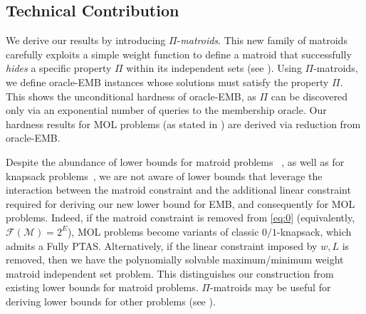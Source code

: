 \documentclass[11pt,letter]{article}
\newcommand{\cm}{{\mathcal{M}}}
\newcommand{\cF}{{\mathcal{F}}}
\begin{document}
 

\subsection{Technical Contribution}
We derive our results by introducing $\Pi$-{\em matroids}.
This new family of matroids carefully exploits a simple weight function to define a matroid that successfully {\em hides} a specific property $\Pi$ within its independent sets (see ). Using $\Pi$-matroids, we define %
	oracle-EMB instances whose solutions must satisfy the property $\Pi$. This shows the unconditional hardness of oracle-EMB, as $\Pi$ can be discovered only via an exponential number of queries to the membership oracle. Our hardness results for MOL problems (as stated in ) are derived via reduction from oracle-EMB.
	
	
		Despite the abundance of lower bounds for matroid problems~%
		\cite{lovasz1978matroid,JK82,karp1985complexity,soto2014simple}, as well as for knapsack  problems~\cite{chekuri2005polynomial,kulik2010there,cygan2019problems,bringmann2021fine}, we are not aware of lower bounds that leverage the interaction between the matroid constraint and the additional linear constraint required for deriving our new lower bound for EMB, and consequently for MOL problems. Indeed, if the matroid constraint is removed from \eqref{eq:0} (equivalently, $\cF(\cm)=2^E$), MOL problems become variants of classic 
	$0/1${\sc-knapsack}, which admits a Fully PTAS. Alternatively, if the linear constraint imposed by $w,L$ is removed, then we have the polynomially solvable maximum/minimum weight matroid independent set problem. This distinguishes our construction from existing lower bounds for matroid problems. %
	 $\Pi$-matroids may be useful for deriving lower bounds for other problems %
	(see ).  
	

	
	
\end{document}
